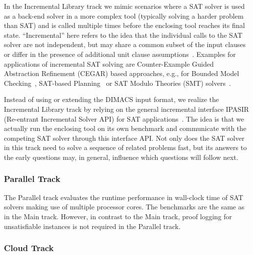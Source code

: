 \documentclass{elsarticle}
\begin{document}
In the Incremental Library track we mimic scenarios
where a SAT solver is used as a back-end solver in a more complex tool
(typically solving a harder problem than SAT) and is called multiple times before 
the enclosing tool reaches its final state. 
``Incremental'' here refers to the idea that the individual calls to the SAT solver are not independent, but may share a common subset of the input clauses or differ in the presence of additional unit clause assumptions~\cite{Nadel:2014:Incremental,Fazekas:2019:IncrementalInprocessing}. 
Examples for applications of incremental SAT solving are Counter-Example Guided Abstraction Refinement (CEGAR) based approaches, e.g., for Bounded Model Checking~\cite{Strichman:2005:ARBMC}, SAT-based Planning~\cite{Balyo:2017:IncrPlanning} or SAT Modulo Theories (SMT) solvers~\cite{Brummayer:2009:Boolector}. 

Instead of using or extending the DIMACS input format, we realize the Incremental Library track
by relying on the general incremental interface IPASIR (Re-entrant Incremental Solver API) 
for SAT applications~\cite{Balyo:2015:SATRace}. The idea is that we actually run the 
enclosing tool on its own benchmark and communicate with the competing SAT solver 
through this interface API. 
%
Not only does the SAT solver in this track
need to solve a sequence of related problems fast, but its answers to the early questions
may, in general, influence which questions will follow next.

\subsubsection{Parallel Track}

The Parallel track evaluates the runtime performance in wall-clock time of SAT solvers making use of multiple processor cores.
The benchmarks %
are the same as in the Main track. 
However, in contrast to the Main track, proof logging for unsatisfiable instances is not required in the Parallel track. 

\subsubsection{Cloud Track}
\end{document}
